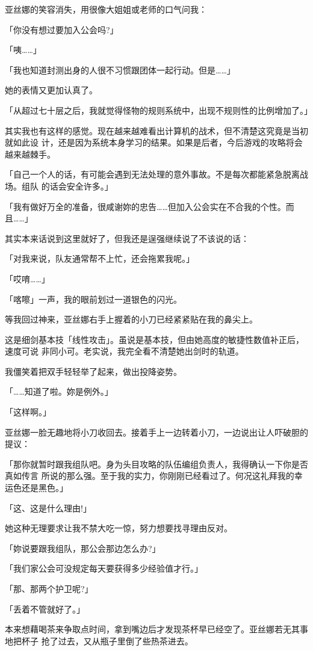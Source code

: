 \documentclass[11pt]{book}
\begin{document}
亚丝娜的笑容消失，用很像大姐姐或老师的口气问我：

「你没有想过要加入公会吗?」

「咦……」

「我也知道封测出身的人很不习惯跟团体一起行动。但是……」

她的表情又更加认真了。

「从超过七十层之后，我就觉得怪物的规则系统中，出现不规则性的比例增加了。」

其实我也有这样的感觉。现在越来越难看出计算机的战术，但不清楚这究竟是当初就如此设
计，还是因为系统本身学习的结果。如果是后者，今后游戏的攻略将会越来越棘手。

「自己一个人的话，有可能会遇到无法处理的意外事故。不是每次都能紧急脱离战场。组队
的话会安全许多。」

「我有做好万全的准备，很咸谢妳的忠告……但加入公会实在不合我的个性。而且……」

其实本来话说到这里就好了，但我还是逞强继续说了不该说的话：

「对我来说，队友通常帮不上忙，还会拖累我呢。」

「哎唷……」

「喀嚓」一声，我的眼前划过一道银色的闪光。

等我回过神来，亚丝娜右手上握着的小刀已经紧紧贴在我的鼻尖上。

这是细剑基本技「线性攻击」。虽说是基本技，但由她高度的敏捷性数值补正后，速度可说
非同小可。老实说，我完全看不清楚她出剑时的轨道。

我僵笑着把双手轻轻举了起来，做出投降姿势。

「……知道了啦。妳是例外。」

「这样啊。」

亚丝娜一脸无趣地将小刀收回去。接着手上一边转着小刀，一边说出让人吓破胆的提议：

「那你就暂时跟我组队吧。身为头目攻略的队伍编组负责人，我得确认一下你是否真如传言
所说的那么强。至于我的实力，你刚刚已经看过了。何况这礼拜我的幸运色还是黑色。」

「这、这是什么理由!」

她这种无理要求让我不禁大吃一惊，努力想要找寻理由反对。

「妳说要跟我组队，那公会那边怎么办?」

「我们家公会可没规定每天要获得多少经验值才行。」

「那、那两个护卫呢?」

「丢着不管就好了。」

本来想藉喝茶来争取点时间，拿到嘴边后才发现茶杯早已经空了。亚丝娜若无其事地把杯子
抢了过去，又从瓶子里倒了些热茶进去。
\end{document}
